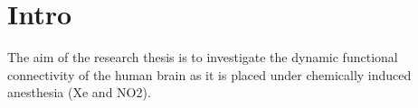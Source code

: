 \documentclass{article}
\begin{document}
\section{Intro}
The aim of the research thesis is to investigate the dynamic functional connectivity of the human brain as it is placed under chemically induced anesthesia (Xe and NO2).
\end{document}
